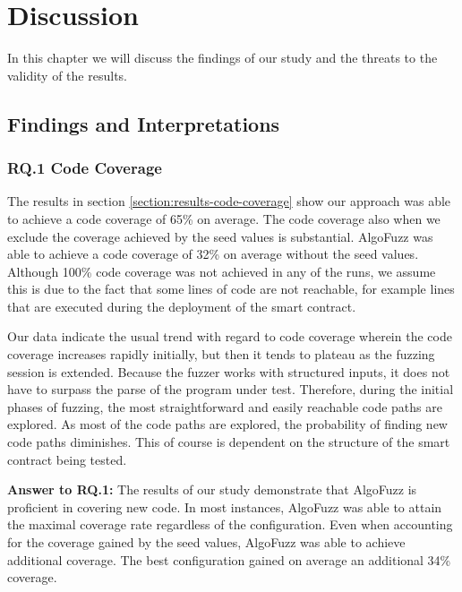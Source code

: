 
\chapter{Discussion}\label{chapter:discussion}
In this chapter we will discuss the findings of our study and the threats to the validity of the results.

\section{Findings and Interpretations}

\subsection*{RQ.1 Code Coverage}
The results in section \ref{section:results-code-coverage} show our approach was able to achieve a code coverage of 65\% on average.
The code coverage also when we exclude the coverage achieved by the seed values is substantial.
AlgoFuzz was able to achieve a code coverage of 32\% on average without the seed values.
Although 100\% code coverage was not achieved in any of the runs, we assume this is due to the fact that some lines of code are not reachable, for example lines that are executed during the deployment of the smart contract.

Our data indicate the usual trend with regard to code coverage wherein the code coverage increases rapidly initially, but then it tends to plateau as the fuzzing session is extended.
Because the fuzzer works with structured inputs, it does not have to surpass the parse of the program under test.
Therefore, during the initial phases of fuzzing, the most straightforward and easily reachable code paths are explored.
As most of the code paths are explored, the probability of finding new code paths diminishes.
This of course is dependent on the structure of the smart contract being tested.

\begin{mybox}
    \textbf{Answer to RQ.1:} The results of our study demonstrate that AlgoFuzz is proficient in covering new code.
    In most instances, AlgoFuzz was able to attain the maximal coverage rate regardless of the configuration.
    Even when accounting for the coverage gained by the seed values, AlgoFuzz was able to achieve additional coverage. The best configuration gained on average an additional 34\% coverage.
\end{mybox}

